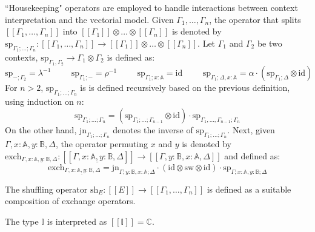 ``Housekeeping" operators are employed to handle interactions between context interpretation and the vectorial model. Given $\Gamma_{1}, \ldots, \Gamma_{n}$, the operator that splits $[\![\Gamma_{1}, \ldots, \Gamma_{n}]\!]$ into $[\![\Gamma_{1}]\!] \otimes \ldots \otimes [\![\Gamma_{n}]\!]  $ is denoted by $\text{sp}_{\Gamma_1;\ldots;\Gamma_n}: [\![\Gamma_{1}, \ldots, \Gamma_{n}]\!] \xrightarrow{} [\![\Gamma_{1}]\!] \otimes \ldots \otimes [\![\Gamma_{n}]\!] $. Let $\Gamma_1$ and $\Gamma_2$ be two contexts, $\text{sp}_{\Gamma_1, \Gamma_2} \rightarrow \Gamma_1\otimes \Gamma_2$ is defined as:
\begin{equation*}
  \text{sp}_{-; \Gamma_2} = \lambda^{-1} \hspace{1cm} \text{sp}_{\Gamma_1; -} = \rho^{-1} \hspace{1cm} \text{sp}_{\Gamma_1;x:\mathbb{A}} = \text{id} \hspace{1cm} \text{sp}_{\Gamma_1; \Delta, x: \mathbb{A}} = \alpha \cdot (\text{sp}_{\Gamma_1; \Delta} \otimes \text{id})
\end{equation*}
For $n>2$, $\text{sp}_{\Gamma_1;\ldots;\Gamma_n}$ is is defined recursively based on the previous definition, using induction on $n$:
\begin{equation*}
  \text{sp}_{\Gamma_1;\ldots;\Gamma_n} = (\text{sp}_{\Gamma_1;\ldots;\Gamma_{n-1}} \otimes \text{id} )\cdot \text{sp}_{\Gamma_1, \ldots, \Gamma_{n-1} ;\Gamma_n}
\end{equation*}
On the other hand, $\text{jn}_{\Gamma_1;\ldots;\Gamma_n}$ denotes the inverse of $\text{sp}_{\Gamma_1;\ldots;\Gamma_n}$. Next, given $\Gamma, x : \mathbb{A}, y : \mathbb{B},\Delta$, the operator permuting $x$ and $y$ is denoted by $\text{exch}_{\Gamma, x : \mathbb{A}, y : \mathbb{B},\Delta}: [\![\Gamma,\underline{ x : \mathbb{A}, y : \mathbb{B}},\Delta]\!] \xrightarrow{} [\![\Gamma, y : \mathbb{B}, x : \mathbb{A}, \Delta]\!] $ and defined as:
\begin{equation*}
  \text{exch}_{\Gamma, \underline{ x : \mathbb{A}, y : \mathbb{B}},\Delta} = \text{jn}_{\Gamma; y:\mathbb{B}, x:\mathbb{A};\Delta} \cdot (\text{id}\otimes \text{sw} \otimes \text{id} ) \cdot \text{sp}_{\Gamma; x:\mathbb{A}, y:\mathbb{B};\Delta}
\end{equation*} 


The shuffling operator $\text{sh}_{E}: [\![E]\!] \xrightarrow{} [\![\Gamma_1, \ldots, \Gamma_n ]\!]$ is defined as a suitable composition of exchange operators.

The type $\mathbb{I}$ is interpreted as $[\![\mathbb{I}]\!]=\mathbb{C}$.

